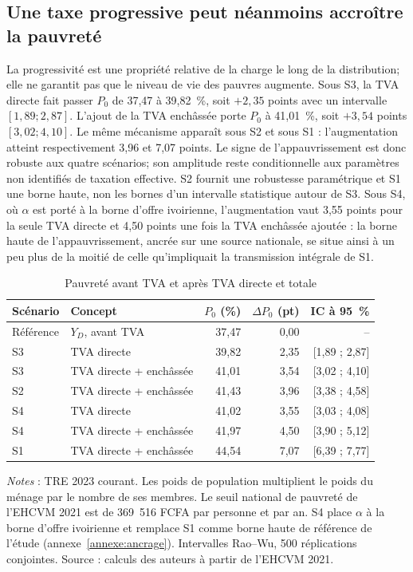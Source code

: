\documentclass[11pt,a4paper]{article}
\begin{document}
\subsection{Une taxe progressive peut néanmoins accroître la pauvreté}

La progressivité est une propriété relative de la charge le long de la
distribution; elle ne garantit pas que le niveau de vie des pauvres augmente.
Sous S3, la TVA directe fait passer $P_0$ de 37,47 à 39,82~\%, soit
$+2,35$ points avec un intervalle $[1,89;2,87]$. L'ajout de la TVA enchâssée
porte $P_0$ à 41,01~\%, soit $+3,54$ points $[3,02;4,10]$. Le même mécanisme
apparaît sous S2 et sous S1 : l'augmentation atteint respectivement 3,96 et
7,07 points. Le signe de l'appauvrissement est donc robuste aux quatre scénarios;
son amplitude reste conditionnelle aux paramètres non identifiés de taxation
effective. S2 fournit une robustesse paramétrique et S1 une borne haute, non les
bornes d'un intervalle statistique autour de S3. Sous S4, où $\alpha$ est porté à
la borne d'offre ivoirienne, l'augmentation vaut 3,55 points pour la seule TVA
directe et 4,50 points une fois la TVA enchâssée ajoutée : la borne haute de
l'appauvrissement, ancrée sur une source nationale, se situe ainsi à un peu plus
de la moitié de celle qu'impliquait la transmission intégrale de S1.

\begin{table}[t]
\centering
\begin{threeparttable}
\caption{Pauvreté avant TVA et après TVA directe et totale}
\label{tab:fgt-io}
\begin{tabular}{llrrr}
\toprule
Scénario & Concept & $P_0$ (\%) & $\Delta P_0$ (pt) & IC à 95~\% \\
\midrule
Référence & $Y_D$, avant TVA & 37,47 & 0,00 & -- \\
S3 & TVA directe & 39,82 & 2,35 & [1,89 ; 2,87] \\
S3 & TVA directe + enchâssée & 41,01 & 3,54 & [3,02 ; 4,10] \\
S2 & TVA directe + enchâssée & 41,43 & 3,96 & [3,38 ; 4,58] \\
S4 & TVA directe & 41,02 & 3,55 & [3,03 ; 4,08] \\
S4 & TVA directe + enchâssée & 41,97 & 4,50 & [3,90 ; 5,12] \\
S1 & TVA directe + enchâssée & 44,54 & 7,07 & [6,39 ; 7,77] \\
\bottomrule
\end{tabular}
\begin{tablenotes}\footnotesize
\item \emph{Notes} : TRE 2023 courant. Les poids de population multiplient le
poids du ménage par le nombre de ses membres. Le seuil national de pauvreté de
l'EHCVM 2021 est de 369~516 FCFA par personne et par an. S4 place $\alpha$ à la
borne d'offre ivoirienne et remplace S1 comme borne haute de référence de
l'étude (annexe~\ref{annexe:ancrage}).
Intervalles Rao--Wu, 500 réplications conjointes. Source : calculs des auteurs à partir de l'EHCVM 2021.
\end{tablenotes}
\end{threeparttable}
\end{table}
\end{document}
